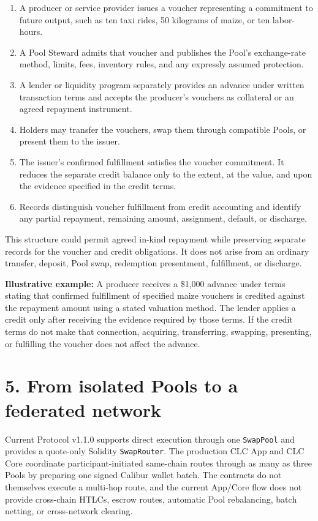 \documentclass[11pt]{article}
\begin{document}
\begin{enumerate}[leftmargin=*]
\item A producer or service provider issues a voucher representing a commitment to future output, such as ten taxi rides, 50 kilograms of maize, or ten labor-hours.
\item A Pool Steward admits that voucher and publishes the Pool's exchange-rate method, limits, fees, inventory rules, and any expressly assumed protection.
\item A lender or liquidity program separately provides an advance under written transaction terms and accepts the producer's vouchers as collateral or an agreed repayment instrument.
\item Holders may transfer the vouchers, swap them through compatible Pools, or present them to the issuer.
\item The issuer's confirmed fulfillment satisfies the voucher commitment. It reduces the separate credit balance only to the extent, at the value, and upon the evidence specified in the credit terms.
\item Records distinguish voucher fulfillment from credit accounting and identify any partial repayment, remaining amount, assignment, default, or discharge.
\end{enumerate}
This structure could permit agreed in-kind repayment while preserving separate records for the voucher and credit obligations. It does not arise from an ordinary transfer, deposit, Pool swap, redemption presentment, fulfillment, or discharge.

\textbf{Illustrative example:} A producer receives a \$1,000 advance under terms stating that confirmed fulfillment of specified maize vouchers is credited against the repayment amount using a stated valuation method. The lender applies a credit only after receiving the evidence required by those terms. If the credit terms do not make that connection, acquiring, transferring, swapping, presenting, or fulfilling the voucher does not affect the advance.


\section*{5. From isolated Pools to a federated network}

Current Protocol v1.1.0 supports direct execution through one \texttt{SwapPool} and provides a quote-only Solidity \texttt{SwapRouter}. The production CLC App and CLC Core coordinate participant-initiated same-chain routes through as many as three Pools by preparing one signed Calibur wallet batch. The contracts do not themselves execute a multi-hop route, and the current App/Core flow does not provide cross-chain HTLCs, escrow routes, automatic Pool rebalancing, batch netting, or cross-network clearing.
\end{document}
